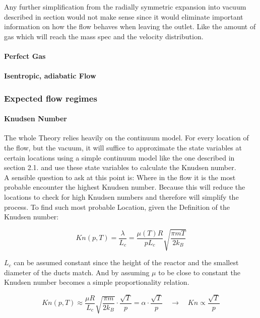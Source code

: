 		Any further simplification from the radially symmetric expansion into vacuum described in section would not make sense since it would eliminate important information on how the flow behaves when leaving the outlet.
		Like the amount of gas which will reach the mass spec and the velocity distribution.

\paragraph{Perfect Gas}

\paragraph{Isentropic, adiabatic Flow}

\newpage

\subsubsection{Expected flow regimes}

\paragraph{Knudsen Number}
	The whole Theory relies heavily on the continuum model.
	For every location of the flow, but the vacuum, it will suffice to approximate the state variables at certain locations using a simple continuum model like the one described in section 2.1.
	  and use these state variables to calculate the Knudsen number.\\

	A sensible question to ask at this point is: Where in the flow it is the most probable encounter the highest Knudsen number.
	Because this will reduce the locations to check for high Knudsen numbers and therefore will simplify the process.
	To find such most probable Location, given the Definition of the Knudsen number:

	$$
	Kn(p,T) = \frac{\lambda}{L_c} = \frac{\mu(T)R}{pL_c}\sqrt{\frac{\pi m T}{2k_B}}
	$$

	$L_c$ can be assumed constant since the height of the reactor and the smallest diameter of the ducts match.
	And by assuming $\mu$ to be close to constant the Knudsen number becomes a simple proportionality relation.

	$$
	Kn(p,T)\approx\frac{\mu R}{L_c}\sqrt{\frac{\pi m}{2k_B}}\cdot\frac{\sqrt{T}}{p}=\alpha\cdot\frac{\sqrt{T}}{p}\quad\rightarrow\quad Kn\propto \frac{\sqrt{T}}{p}
	$$

